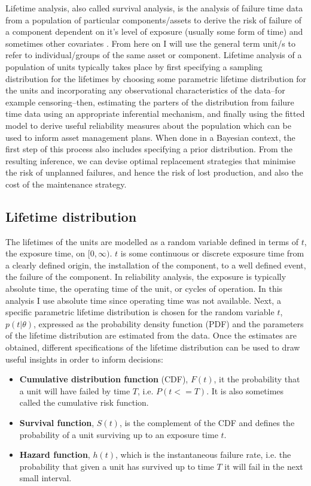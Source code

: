 Lifetime analysis, also called survival analysis, is the analysis of failure time data from a population of particular components/assets to derive the risk of failure of a component dependent on it's level of exposure (usually some form of time) and sometimes other covariates \citep{moore2016}. From here on I will use the general term unit/s to refer to individual/groups of the same asset or component. Lifetime analysis of a population of units typically takes place by first specifying a sampling distribution for the lifetimes by choosing some parametric lifetime distribution for the units and incorporating any observational characteristics of the data--for example censoring--then, estimating the parters of the distribution from failure time data using an appropriate inferential mechanism, and finally using the fitted model to derive useful reliability measures about the population which can be used to inform asset management plans. When done in a Bayesian context, the first step of this process also includes specifying a prior distribution. From the resulting inference, we can devise optimal replacement strategies that minimise the risk of unplanned failures, and hence the risk of lost production, and also the cost of the maintenance strategy.

\subsection{Lifetime distribution}

The lifetimes of the units are modelled as a random variable defined in terms of $t$, the exposure time, on $[0, \infty)$. $t$ is some continuous or discrete exposure time from a clearly defined origin, the installation of the component, to a well defined event, the failure of the component. In reliability analysis, the exposure is typically absolute time, the operating time of the unit, or cycles of operation. In this analysis I use absolute time since operating time was not available. Next, a specific parametric lifetime distribution is chosen for the random variable $t$, $p(t|\theta)$, expressed as the probability density function (PDF) and the parameters of the lifetime distribution are estimated from the data. Once the estimates are obtained, different specifications of the lifetime distribution can be used to draw useful insights in order to inform decisions:

\begin{itemize}
    \item \textbf{Cumulative distribution function} (CDF), $F(t)$, it the probability that a unit will have failed by time $T$, i.e. $P(t <= T)$. It is also sometimes called the cumulative risk function.
    \item \textbf{Survival function}, $S(t)$, is the complement of the CDF and defines the probability of a unit surviving up to an exposure time $t$.
    \item \textbf{Hazard function}, $h(t)$, which is the instantaneous failure rate, i.e. the probability that given a unit has survived up to time $T$ it will fail in the next small interval.
\end{itemize}

